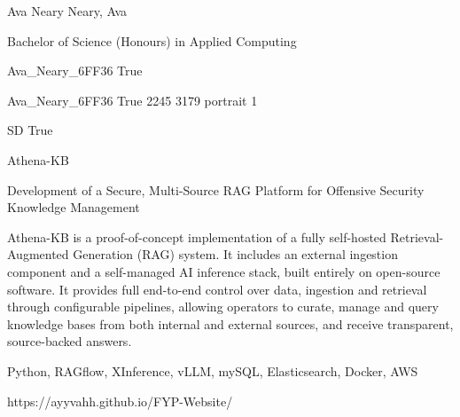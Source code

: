 \documentclass[twoside]{report}
\begin{document}
\begingroup{}\relax



\def\Key{Ava_Neary_6FF36}

{Ava Neary}
{Neary, Ava}

{Bachelor of Science (Honours) in Applied Computing}

{Ava_Neary_6FF36}
{True}

{Ava_Neary_6FF36}
{True}
{2245}
{3179}
{portrait}
{1}

{SD}
{True}

{Athena-KB}

{Development of a Secure, Multi-Source RAG Platform for Offensive Security Knowledge Management}

{Athena-KB is a proof-of-concept implementation of a fully self-hosted Retrieval-Augmented Generation (RAG) system. It includes an external ingestion component and a self-managed AI inference stack, built entirely on open-source software. It provides full end-to-end control over data, ingestion and retrieval through configurable pipelines, allowing operators to curate, manage and query knowledge bases from both internal and external sources, and receive transparent, source-backed answers.}

{Python, RAGflow, XInference, vLLM, mySQL, Elasticsearch, Docker, AWS}

{https://ayyvahh.github.io/FYP-Website/}
\end{document}
